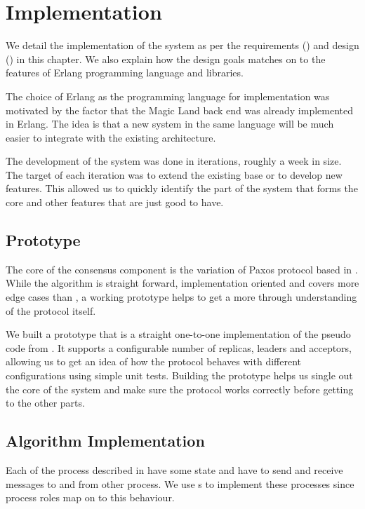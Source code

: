 \chapter{Implementation}
\label{chapter:implementation}

We detail the implementation of the system as per the requirements 
() and
design () in this chapter. We also explain how the
design goals matches on to the features of Erlang programming
language and  libraries.

The choice of Erlang as the programming language for implementation was
motivated by the factor that the Magic Land back end was already implemented in
Erlang. The idea is that a new system in the same language will be much easier
to integrate with the existing architecture.

The development of the system was done in iterations, roughly a week in size.
The target of each iteration was to extend the existing base or to develop
new features. This allowed us to quickly identify the part of the system that
forms the core and other features that are just good to have. 

\section{Prototype}

The core of the consensus component is the variation of Paxos protocol based
in \citet{Robbert2011}. While the algorithm is straight forward, implementation
oriented and covers more edge cases than \citet{Lamport01}, a working prototype
helps to get a more through understanding of the protocol itself.

We built a prototype that is a straight one-to-one implementation of the
pseudo code from \citet{Robbert2011}. It supports a configurable number of
replicas, leaders and acceptors, allowing us to get an idea of how the protocol
behaves with different configurations using simple unit tests. Building the
prototype helps us single out the core of the system and make sure the
protocol works correctly before getting to the other parts.

\section{Algorithm Implementation}

Each of the process described in  have some state
and have to send and receive messages to and from other process. We use 
s
 to implement these processes since process roles map
on to this behaviour.

